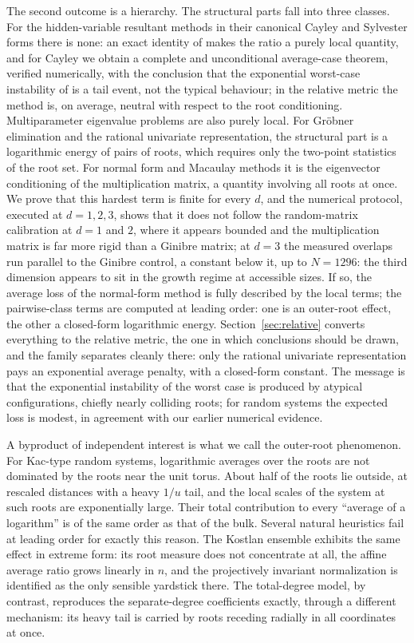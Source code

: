 The second outcome is a hierarchy. The structural parts fall into three classes. For the
hidden-variable resultant methods in their canonical Cayley and Sylvester forms there is none:
an exact identity of \cite{noferini2016numerical} makes the ratio a purely local quantity, and
for Cayley we obtain a complete and unconditional average-case theorem, verified numerically,
with the conclusion that the exponential worst-case instability of \cite{noferini2016numerical}
is a tail event, not the typical behaviour; in the relative metric the method is, on average,
neutral with respect to the root conditioning. Multiparameter eigenvalue problems are also
purely local. For Gr\"obner elimination and the rational univariate representation, the
structural part is a logarithmic energy of pairs of roots, which requires only the two-point
statistics of the root set. For normal form and Macaulay methods it is the eigenvector
conditioning of the multiplication matrix, a quantity involving all roots at once. We prove
that this hardest term is finite for every $d$, and the numerical protocol, executed at
$d=1,2,3$, shows that it does not follow the random-matrix calibration at $d=1$ and $2$, where
it appears bounded and the multiplication matrix is far more rigid than a Ginibre matrix; at
$d=3$ the measured overlaps run parallel to the Ginibre control, a constant below it, up to
$N=1296$: the third dimension appears to sit in the growth regime at accessible sizes. If so,
the average loss of the normal-form method is fully described by the local terms; the
pairwise-class terms are computed at leading order: one is an outer-root effect, the other a
closed-form logarithmic energy. Section~\ref{sec:relative} converts everything to the relative
metric, the one in which conclusions should be drawn, and the family separates cleanly there:
only the rational univariate representation pays an exponential average penalty, with a
closed-form constant. The message is that the exponential instability of the worst case is
produced by atypical configurations, chiefly nearly colliding roots; for random systems the
expected loss is modest, in agreement with our earlier numerical evidence.

A byproduct of independent interest is what we call the outer-root phenomenon. For Kac-type
random systems, logarithmic averages over the roots are not dominated by the roots near the
unit torus. About half of the roots lie outside, at rescaled distances with a heavy $1/u$ tail,
and the local scales of the system at such roots are exponentially large. Their total
contribution to every ``average of a logarithm'' is of the same order as that of the bulk.
Several natural heuristics fail at leading order for exactly this reason. The Kostlan ensemble
exhibits the same effect in extreme form: its root measure does not concentrate at all, the
affine average ratio grows linearly in $n$, and the projectively invariant normalization is
identified as the only sensible yardstick there. The total-degree model, by contrast,
reproduces the separate-degree coefficients exactly, through a different mechanism: its heavy
tail is carried by roots receding radially in all coordinates at once.

